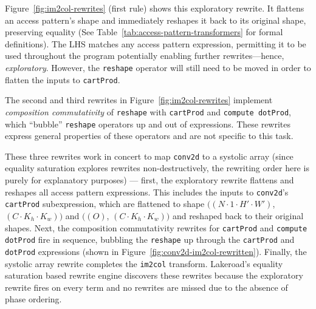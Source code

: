 \documentclass[prologue, dvipsnames, sigplan, screen, review, anonymous]{acmart}
\newcommand{\g}{Lakeroad\xspace}
\newcommand{\accesspatternshape}[2]{$($$\left( #1 \right)$, $\left( #2 \right)$$)$}
\newcommand{\ctd}{\texttt{conv2d}\xspace}
\newcommand{\tcd}[1]{\texttt{#1}}
\begin{document}
Figure~\ref{fig:im2col-rewrites} (first rule)
  shows this exploratory rewrite.
It flattens 
  an access pattern's shape
  and immediately reshapes it
  back to its original shape, preserving equality
(See Table~\ref{tab:access-pattern-transformers}
  for formal definitions).
The LHS matches
  any access pattern expression,
  permitting it to be used throughout the program
  potentially enabling further rewrites---hence, \textit{exploratory}.
However, the \tcd{reshape} operator
  will still need to be moved 
  in order to flatten the inputs to \tcd{cartProd}.

The second and third rewrites
  in Figure~\ref{fig:im2col-rewrites}
  implement \textit{composition commutativity}
  of \tcd{reshape}
  with \tcd{cartProd} and \tcd{compute dotProd},
  which ``bubble'' \tcd{reshape} operators
  up and out of expressions.
These rewrites
  express general properties of these operators
  and are not specific
  to this task.

These three rewrites work in concert 
  to map \ctd
  to a systolic array
(since equality saturation 
  explores rewrites non-destructively, 
  the rewriting order here
  is purely for explanatory purposes) ---
first,
  the exploratory rewrite
  flattens and reshapes
  all access pattern expressions.
This includes the inputs
  to \ctd's \tcd{cartProd}
  subexpression,
  which are flattened
  to shape
  \accesspatternshape
  {N \cdot 1 \cdot H' \cdot W'}{C \cdot K_h \cdot K_w}
  and
  \accesspatternshape
  {O}{C \cdot K_h \cdot K_w}
  and reshaped
  back to their original shapes.
Next,
  the composition commutativity rewrites
  for \tcd{cartProd} 
  and
  \tcd{compute dotProd}
  fire in sequence,
  bubbling the \tcd{reshape} up
  through the 
  \tcd{cartProd} 
  and \tcd{dotProd} 
  expressions (shown in Figure~\ref{fig:conv2d-im2col-rewritten}).
Finally,
  the systolic array rewrite
  completes the \tcd{im2col} transform.
\g's equality saturation based rewrite engine
  discovers these rewrites
  because the exploratory rewrite 
  fires on every term
  and no rewrites are missed
  due to the absence of phase ordering.
\end{document}
